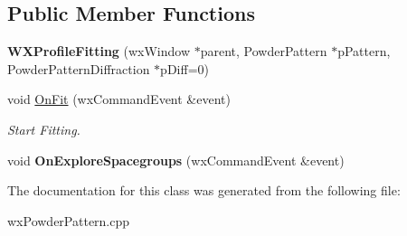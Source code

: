 \subsection*{Public Member Functions}
\begin{DoxyCompactItemize}
\item 
\mbox{\label{class_obj_cryst_1_1_w_x_profile_fitting_a99338ff03cceec7c98a8893db99c80b5}} 
{\bfseries W\+X\+Profile\+Fitting} (wx\+Window $\ast$parent, Powder\+Pattern $\ast$p\+Pattern, Powder\+Pattern\+Diffraction $\ast$p\+Diff=0)
\item 
\mbox{\label{class_obj_cryst_1_1_w_x_profile_fitting_a6051934c132edc8f66241f58f7e861cb}} 
void \mbox{\hyperlink{class_obj_cryst_1_1_w_x_profile_fitting_a6051934c132edc8f66241f58f7e861cb}{On\+Fit}} (wx\+Command\+Event \&event)
\begin{DoxyCompactList}\small\item\em Start Fitting. \end{DoxyCompactList}\item 
\mbox{\label{class_obj_cryst_1_1_w_x_profile_fitting_a7f105820bc793b2269b12a5a1f539b6e}} 
void {\bfseries On\+Explore\+Spacegroups} (wx\+Command\+Event \&event)
\end{DoxyCompactItemize}


The documentation for this class was generated from the following file\+:\begin{DoxyCompactItemize}
\item 
wx\+Powder\+Pattern.\+cpp\end{DoxyCompactItemize}

